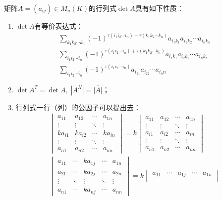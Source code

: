 \begin{property}\label{prop:Determinant}
	矩阵$A=(a_{ij})\in M_{n}(K)$的行列式$\det A$具有如下性质：
	\begin{enumerate}
		\item $\det A$有等价表达式：
		\begin{gather*}
			\sum_{k_1k_2\cdots k_n}^{}(-1)^{\tau(i_1i_2\cdots i_n)+\tau(k_1k_2\cdots k_n)}a_{i_1k_1}a_{i_2k_2}\cdots a_{i_nk_n} \\
			\sum_{i_1i_2\cdots i_n}^{}(-1)^{\tau(i_1i_2\cdots i_n)+\tau(k_1k_2\cdots k_n)}a_{i_1k_1}a_{i_2k_2}\cdots a_{i_nk_n} \\
			\sum_{i_1i_2\cdots i_n}^{}(-1)^{\tau(i_1i_2\cdots i_n)}a_{i_11}a_{i_22}\cdots a_{i_nn}
		\end{gather*}
		\item $\det A^T=\det A,\;|A^H|=\overline{|A|}$；
		\item 行列式一行（列）的公因子可以提出去：
		\begin{gather*}
			\begin{vmatrix}
				a_{11} & a_{12} & \cdots & a_{1n} \\
				\vdots & \vdots & \ddots & \vdots \\
				ka_{i1} & ka_{i2} & \cdots & ka_{in} \\
				\vdots & \vdots & \ddots & \vdots \\
				a_{n1} & a_{n2} & \cdots & a_{nn}
			\end{vmatrix}=k
			\begin{vmatrix}
				a_{11} & a_{12} & \cdots & a_{1n} \\
				\vdots & \vdots & \ddots & \vdots \\
				a_{i1} & a_{i2} & \cdots & a_{in} \\
				\vdots & \vdots & \ddots & \vdots \\
				a_{n1} & a_{n2} & \cdots & a_{nn}
			\end{vmatrix} \\
			\begin{vmatrix}
				a_{11} & \cdots & ka_{1j} & \cdots & a_{1n} \\
				a_{21} & \cdots & ka_{2j} & \cdots & a_{2n} \\
				\vdots & \ddots & \vdots & \ddots & \vdots \\
				a_{n1} & \cdots & ka_{nj} & \cdots & a_{nn}
			\end{vmatrix}=k
			\begin{vmatrix}
				a_{11} & \cdots & a_{1j} & \cdots & a_{1n} \\

\end{vmatrix}
\end{gather*}
\end{enumerate}
\end{property}
